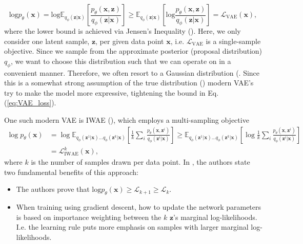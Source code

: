 \documentclass{article}
\begin{document}
\begin{equation}
    \text{log} p_{\theta}(\bm x) = \text{log} \mathbb E_{q_{\phi}(\bm z|\bm x)} \left[\frac{p_{\theta}(\bm x, \bm z)}{q_{\phi}(\bm z|\bm x)}\right]
    \geq \mathbb E_{q_{\phi}(\bm z|\bm x)} \left[\text{log}\frac{p_{\theta}(\bm x, \bm z)}{q_{\phi}(\bm z|\bm x)}\right] = \mathcal{L}_{\text{VAE}}(\bm x),
\label{eq:VAE_loss}
\end{equation}
where the lower bound is achieved via Jensen's Inequality (\cite{kingma2013autoencoding}). Here, we only consider one latent sample, $\bm z$, per given data point $\bm x$, i.e. $\mathcal{L}_{\text{VAE}}$ is a single-sample objective. Since we sample from the approximate posterior (proposal distribution) $q_{\phi}$, we want to choose this distribution such that we can operate on in a convenient manner. Therefore, we often resort to a Gaussian distribution (\cite{iwae, kingma2013autoencoding,kingma2019introduction}. Since this is a somewhat strong assumption of the true distribution (\cite{kingma2018glow, rezende2015variational}) modern VAE's try to make the model more expressive, tightening the bound in Eq. (\ref{eq:VAE_loss}).

One such modern VAE is IWAE (\cite{iwae}), which employs a multi-sampling objective 
\begin{equation}
\begin{split}
    \log p_{\theta}(\bm x) &= \log \mathbb E_{q_{\phi}(\bm z^1|\bm x)…q_{\phi}(\bm z^k|\bm x)} \left[\frac{1}{k}\sum_i\frac{p_{\theta}(\bm x, \bm z^i)}{q_{\phi}(\bm z^i|\bm x)}\right]
\label{eq:IWAE_loss}
    \geq \mathbb E_{q_{\phi}(\bm z^1|\bm x)…q_{\phi}(\bm z^k|\bm x)} \left[\log\frac{1}{k}\sum_i\frac{p_{\theta}(\bm x, \bm z^i)}{q_{\phi}(\bm z^i|\bm x)}\right]\\ 
    &= \mathcal{L}^k_{\text{IWAE}}(\bm x),
    \end{split}
\end{equation}
where $k$ is the number of samples drawn per data point. In \cite{iwae}, the authors state two fundamental benefits of this approach:
\begin{itemize}
    \item The authors prove that $\text{log} p_{\theta}(\bm x) \geq \mathcal{L}_{k+1}\geq \mathcal{L}_k$.
    \item When training using gradient descent, how to update the network parameters is based on importance weighting between the $k$ $\bm z$'s marginal log-likelihoods. I.e. the learning rule puts more emphasis on samples with larger marginal log-likelihoods.
\end{itemize}
\end{document}
